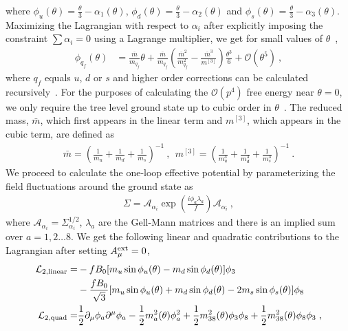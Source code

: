 \documentclass[12pt]{elsarticle}
\begin{document}
where $\phi_{u}(\theta)=\frac{\theta}{3}-\alpha_{1}(\theta)$, $\phi_{d}(\theta)=\frac{\theta}{3}-\alpha_{2}(\theta)$ and $\phi_{s}(\theta)=\frac{\theta}{3}-\alpha_{3}(\theta)$. Maximizing the Lagrangian with respect to $\alpha_{i}$ after explicitly imposing the constraint $\sum\alpha_{i}=0$ using a Lagrange multiplier, we get for small values of $\theta$~\cite{Mao:2009sy}, 
\begin{equation}
\begin{split}
\label{eq:treelevelphi}
\phi_{q_{f}}(\theta)&=\frac{\bar{m}}{m_{q_{f}}}\theta+\frac{\bar{m}}{m_{q_{f}}}\left(\frac{\bar{m}^{2}}{m_{q_{f}}^{2}}-\frac{\bar{m}^{3}}{m^{[3]}}\right)\frac{\theta^{3}}{6}+\mathcal{O}(\theta^{5})\ ,
\end{split}
\end{equation}
where $q_{f}$ equals $u$, $d$ or $s$ and higher order corrections can be calculated recursively~\cite{Lu_2020}. For the purposes of calculating the $\mathcal{O}(p^{4})$ free energy near $\theta=0$, we only require the tree level ground state up to cubic order in $\theta$~\cite{Guo:2015oxa}. The reduced mass, $\bar{m}$, which first appears in the linear term and $m^{[3]}$, which appears in the cubic term, are defined as
\begin{align}
\label{eq:mbarm3}
\bar{m}=\left(\frac{1}{m_{u}}+\frac{1}{m_{d}}+\frac{1}{m_{s}}\right)^{-1}\ ,\ \ m^{[3]}=\left(\frac{1}{m_{u}^{3}}+\frac{1}{m_{d}^{3}}+\frac{1}{m_{s}^{3}}\right)^{-1}\ .
\end{align}
We proceed to calculate the one-loop effective potential by parameterizing the field fluctuations around the ground state as
\begin{equation}
\begin{split}
\Sigma=\mathcal{A}_{\alpha_{i}}\exp\left(\tfrac{i\phi_{a}\lambda_{a}}{f}\right)\mathcal{A}_{\alpha_{i}}\ ,
\end{split}
\end{equation}
where $\mathcal{A}_{\alpha_{i}}=\Sigma_{\alpha_{i}}^{1/2}$, $\lambda_{a}$ are the Gell-Mann matrices and there is an implied sum over $a=1,2\dots 8$. We get the following linear and quadratic contributions to the Lagrangian after setting $A_{\mu}^{\rm ext}=0$,
\begin{align}
\nonumber
\mathcal{L}_{2,\rm linear}=&-fB_{0}[m_{u}\sin\phi_{u}(\theta)-m_{d}\sin\phi_{d}(\theta)]\phi_{3}\\
&-\frac{fB_{0}}{\sqrt{3}}[m_{u}\sin\phi_{u}(\theta)+m_{d}\sin\phi_{d}(\theta)-2m_{s}\sin\phi_{s}(\theta)]\phi_{8}\\
\mathcal{L}_{2,\rm quad}=&\frac{1}{2}\partial_{\mu}\phi_{a}\partial^{\mu}\phi_{a}-\frac{1}{2}m_{a}^{2}(\theta)\phi_{a}^{2}+\frac{1}{2}m_{38}^{2}(\theta)\phi_{3}\phi_{8}+\frac{1}{2}m_{38}^{2}(\theta)\phi_{8}\phi_{3}\;,
\end{align}
\end{document}
